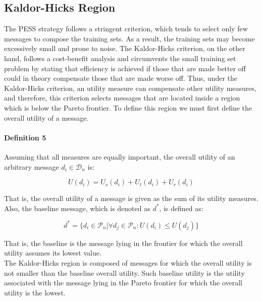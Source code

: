 \documentclass{sig-alternate}
\begin{document}
\subsection*{Kaldor-Hicks Region}
The PESS strategy follows a stringent criterion, which tends to select only few messages to compose the training sets. As a result, the training sets may become excessively small and prone to noise.
The Kaldor-Hicks criterion, on the other hand,
follows a cost-benefit analysis and circumvents the
small training set problem by stating that efficiency is achieved if
those that are made better off could in theory compensate those that are made worse off. Thus, under the Kaldor-Hicks criterion, an utility measure can compensate other utility measures, and therefore, this criterion selects messages that are located inside a region which is below the Pareto frontier. To define this region we must first define the overall utility of a message.

\paragraph*{\bf{Definition 5}} Assuming that all measures are equally important, the overall utility of an arbitrary message $d_i\in\mathcal{D}_n$ is:

\begin{equation}
\label{eq:cost}
U(d_i)=U_s(d_i)+U_t(d_i)+U_r(d_i)
\end{equation}

\noindent That is, the overall utility of a message is given as the sum of its utility measures. Also, the baseline message, which is denoted as $d^*$, is defined as:

\begin{equation}
d^*=\{d_i\in\mathcal{P}_n | \forall d_j\in\mathcal{P}_n: U(d_i)\leq U(d_j)\}
\end{equation}

\noindent That is, the baseline is the message lying in the frontier for which the overall utility assumes its lowest value.\\

The Kaldor-Hicks region is composed of messages for which the overall utility is not smaller than the baseline overall utility. Such baseline utility is the utility associated with the message lying in the Pareto frontier for which the overall utility is the lowest.
\end{document}
